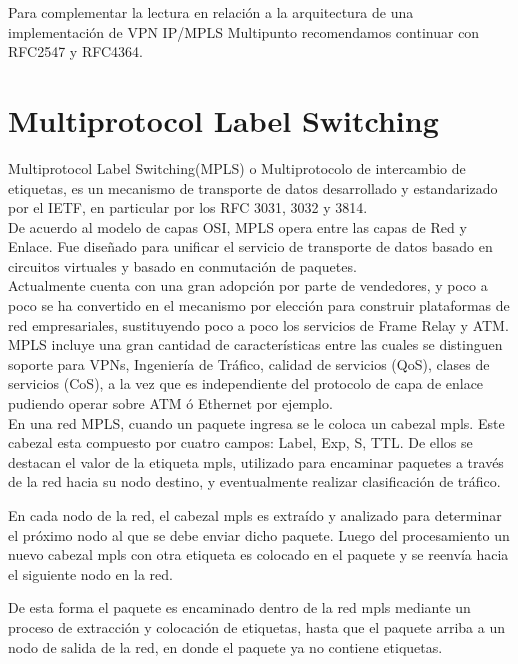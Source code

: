Para complementar la lectura en relaci\'on a la arquitectura de una implementaci\'on de VPN IP/MPLS Multipunto recomendamos continuar con RFC2547\citep{rosen1999bgp} y RFC4364\citep{rosen2006bgp}.

\section{Multiprotocol Label Switching}
\label{section2.8}

Multiprotocol Label Switching(MPLS) o Multiprotocolo de intercambio de etiquetas, es un mecanismo de transporte de datos desarrollado y estandarizado por el IETF, en particular por los RFC 3031\cite{rosen2001multiprotocol}, 3032\citep{rosen2001mpls} y 3814\citep{nadeau2004multiprotocol}.\\

De acuerdo al modelo de capas OSI, MPLS opera entre las capas de Red y Enlace. Fue diseñado para unificar el servicio de transporte de datos basado en circuitos virtuales y basado en conmutación de paquetes.\\

Actualmente cuenta con una gran adopción por parte de vendedores, y poco a poco se ha convertido en el mecanismo por elección para construir plataformas de red empresariales, sustituyendo poco a poco los servicios de Frame Relay y ATM.\\
 
MPLS incluye una gran cantidad de características entre las cuales se distinguen soporte para VPNs, Ingeniería de Tráfico, calidad de servicios (QoS), clases de servicios (CoS), a la vez que es independiente del protocolo de capa de enlace pudiendo operar sobre ATM ó Ethernet por ejemplo.\\

En una red MPLS, cuando un paquete ingresa se le coloca un cabezal mpls. Este cabezal esta compuesto por cuatro campos: Label, Exp, S, TTL. De ellos se destacan el valor de la etiqueta mpls, utilizado para encaminar paquetes a través de la red hacia su nodo destino, y eventualmente realizar clasificación de tr\'afico.

En cada nodo de la red, el cabezal mpls es extraído y analizado para determinar el próximo nodo al que se debe enviar dicho paquete. Luego del procesamiento un nuevo cabezal mpls con otra etiqueta es colocado en el paquete y se reenvía hacia el siguiente nodo en la red.

De esta forma el paquete es encaminado dentro de la red mpls mediante un proceso de extracción y colocación de etiquetas, hasta que el paquete arriba a un nodo de salida de la red, en donde el paquete ya no contiene etiquetas.\\


